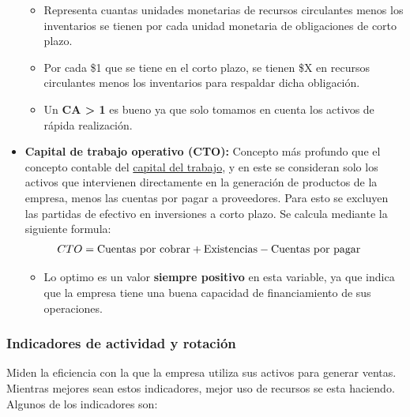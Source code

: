 \documentclass{templateNote}
\begin{document}
\begin{itemize}
    \begin{itemize}
        \item Representa cuantas unidades monetarias de recursos circulantes menos los inventarios se tienen por cada unidad monetaria de obligaciones de corto plazo.
        \item Por cada \$1 que se tiene en el corto plazo, se tienen \$X en recursos circulantes menos los inventarios para respaldar dicha obligación.
        \item Un \textbf{CA > 1} es bueno ya que solo tomamos en cuenta los activos de rápida realización.
    \end{itemize}

    \item\textbf{Capital de trabajo operativo (CTO):}
    \noindent Concepto más profundo que el concepto contable del \hyperref[sec:Capital neto del trabajo (CNT)]{capital del trabajo}, y en este se consideran solo los activos que intervienen directamente
    en la generación de productos de la empresa, menos las cuentas por pagar a proveedores. Para esto se excluyen las partidas de efectivo en inversiones a corto plazo. Se calcula mediante la siguiente formula:
    \begin{align*}
        CTO &= \textnormal{Cuentas por cobrar} + \textnormal{Existencias} - \textnormal{Cuentas por pagar}
    \end{align*}

    \begin{itemize}
        \item Lo optimo es un valor \textbf{siempre positivo} en esta variable, ya que indica que la empresa tiene una buena capacidad de financiamiento de sus operaciones.
    \end{itemize}
\end{itemize}

\subsubsection{Indicadores de actividad y rotación}
\noindent Miden la eficiencia con la que la empresa utiliza sus activos para generar ventas. Mientras mejores sean estos indicadores, mejor uso de recursos se esta haciendo. Algunos de los indicadores son:
\end{document}
